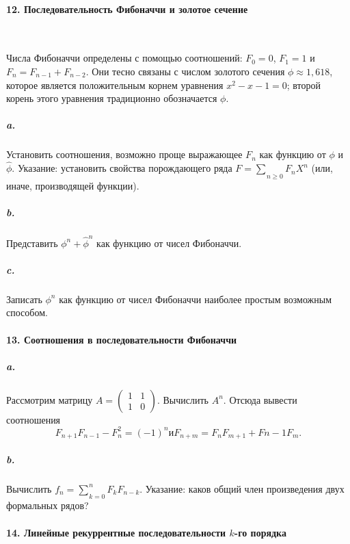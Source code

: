 \paragraph { 12. Последовательность Фибоначчи и золотое сечение}\ \newline

Числа Фибоначчи определены с помощью соотношений: $F_{0}=0$, $F_{1}=1$ и $F_{n}=F_{n-1}+F_{n-2}$. Они тесно связаны с числом золотого сечения $\phi\approx{1,618}$, которое является положительным корнем уравнения $x^{2}-x-1=0$; второй корень этого уравнения традиционно обозначается  $\phi$. 

\newpage

\subparagraph { a.}Установить соотношения, возможно проще выражающее $F_{n}$ как функцию от $\phi$ и $\hat{\phi}$. Указание: установить свойства порождающего ряда 
$F={\sum_{}^{}}_{n\geq{0}}F_{n}X^{n}$ (или, иначе, производящей функции).

\subparagraph { b.}Представить $\phi^{n}+\hat{\phi}^{n}$ как функцию от чисел Фибоначчи. 

\subparagraph { c.} Записать $\phi^{n}$ как функцию от чисел Фибоначчи наиболее простым возможным способом. 

\paragraph { 13. Соотношения в последовательности Фибоначчи }

\subparagraph { a.} Рассмотрим матрицу $A=\begin{pmatrix}1 & 1 \\ 1 & 0 \end{pmatrix}$. Вычислить $A^{n}$. Отсюда вывести соотношения
\begin{equation*}
F_{n+1}F_{n-1}-F_n^2=\left({-1}\right)^{n} и F_{n+m}=F_{n}F_{m+1}+F{n-1}F_{m}.
\end{equation*}
\subparagraph { b.} Вычислить $f_{n}={\sum_{}^{}}_{k=0}^{n}F_{k}F_{n-k}$. Указание: каков общий член произведения двух формальных рядов?

\paragraph { 14. Линейные рекуррентные последовательности $k$-го порядка }

